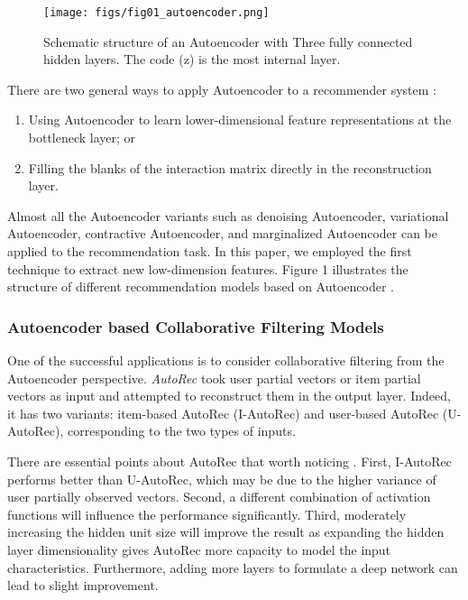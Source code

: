 \documentclass[a4paper,fleqn]{cas-dc}
\begin{document}
\begin{figure}
	\centering
	\texttt{[image: figs/fig01\_autoencoder.png]}
	\caption{Schematic structure of an Autoencoder with Three fully connected hidden layers. The code (z) is the most internal layer.}
	\label{FIG:01}
\end{figure}

There are two general ways to apply Autoencoder to a recommender system \citep{29zhang2019a}:
\begin{enumerate}
	\item Using Autoencoder to learn lower-dimensional feature representations at the bottleneck layer; or
	\item Filling the blanks of the interaction matrix directly in the reconstruction layer.

\end{enumerate}

Almost all the Autoencoder variants such as denoising Autoencoder, variational Autoencoder, contractive Autoencoder, and marginalized Autoencoder can be applied to the recommendation task. In this paper, we employed the first technique to extract new low-dimension features. Figure 1 illustrates the structure of different recommendation models based on Autoencoder \citep{29zhang2019a}.



\subsubsection{Autoencoder based Collaborative Filtering Models}
One of the successful applications is to consider collaborative filtering from the Autoencoder perspective. \textit{AutoRec} \citep{25sedhain2015a} took user partial vectors  or item partial vectors  as input and attempted to reconstruct them in the output layer. Indeed, it has two variants: item-based AutoRec (I-AutoRec) and user-based AutoRec (U-AutoRec), corresponding to the two types of inputs.

There are essential points about AutoRec that worth noticing \citep{29zhang2019a}. First, I-AutoRec performs better than U-AutoRec, which may be due to the higher variance of user partially observed vectors. Second, a different combination of activation functions will influence the performance significantly. Third, moderately increasing the hidden unit size will improve the result as expanding the hidden layer dimensionality gives AutoRec more capacity to model the input characteristics. Furthermore, adding more layers to formulate a deep network can lead to slight improvement.
\end{document}

